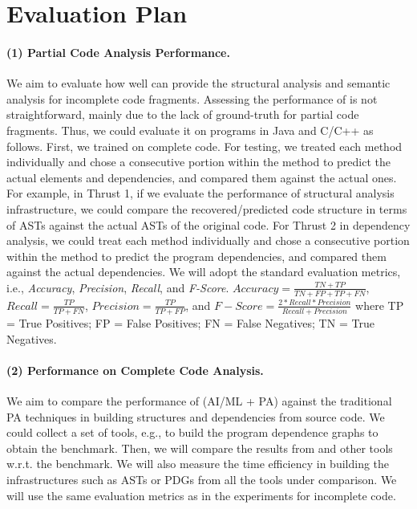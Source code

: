 \section{Evaluation Plan}
\label{eval}






\paragraph{\bf (1) Partial Code Analysis Performance.} We aim
to evaluate how well {\tool} can provide the structural analysis and
semantic analysis for incomplete code fragments.  Assessing the
performance of \tool is not straightforward, mainly due to the lack of
ground-truth for partial code fragments. Thus, we could evaluate it on
programs in Java and C/C++ as follows.  First, we trained {\tool} on
complete code. For testing, we treated each method individually and
chose a consecutive portion within the method to predict the actual
elements and dependencies, and compared them against the actual ones.
For example, in Thrust 1, if we evaluate the performance of structural
analysis infrastructure, we could compare the recovered/predicted code
structure in terms of ASTs against the actual ASTs of the original
code. For Thrust 2 in dependency analysis, we could treat each method
individually and chose a consecutive portion within the method to
predict the program dependencies, and compared them against the actual
dependencies. We will adopt the standard evaluation metrics, i.e.,
\textit{Accuracy}, \textit{Precision}, \textit{Recall}, and
\textit{F-Score}. $Accuracy = \frac{TN+TP}{TN+FP+TP+FN}$, $Recall =
\frac{TP}{TP+FN}$, $Precision = \frac{TP}{TP+FP}$, and $F{-}Score =
\frac{2*Recall*Precision}{Recall+Precision}$ where TP = True
Positives; FP = False Positives; FN = False Negatives; TN = True
Negatives.

\paragraph{\bf (2) Performance on Complete Code Analysis.}
We aim to compare the performance of {\tool} (AI/ML + PA) against the
traditional PA techniques in building structures and dependencies from
source code. We could collect a set of tools, e.g., to build the
program dependence graphs to obtain the benchmark. Then, we will
compare the results from {\tool} and other tools w.r.t. the
benchmark. We will also measure the time efficiency in building the
infrastructures such as ASTs or PDGs from all the tools under
comparison. We will use the same evaluation metrics as in the
experiments for incomplete code.

